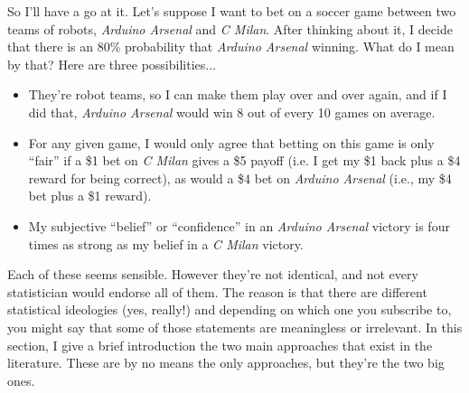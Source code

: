 So I'll have a go at it. Let's suppose I want to bet on a soccer game between two teams of robots, {\it Arduino Arsenal} and {\it C Milan}. After thinking about it, I decide that there is an 80\% probability that {\it Arduino Arsenal} winning. What do I mean by that? Here are three possibilities...
\begin{itemize}
\item They're robot teams, so I can make them play over and over again, and if I did that, {\it Arduino Arsenal} would win 8 out of every 10 games on average.
\item For any given game, I would only agree that betting on this game is only ``fair'' if a \$1 bet on {\it C Milan} gives a \$5 payoff (i.e. I get my \$1 back plus a \$4 reward for being correct), as would a \$4 bet on {\it Arduino Arsenal} (i.e., my \$4 bet plus a \$1 reward). 
\item My subjective ``belief'' or ``confidence'' in an {\it Arduino Arsenal} victory is four times as strong as my belief in a {\it C Milan} victory.
\end{itemize}
Each of these seems sensible. However they're not identical, and not every statistician would endorse all of them. The reason is that there are different statistical ideologies (yes, really!) and depending on which one you subscribe to, you might say that some of those statements are meaningless or irrelevant. In this section, I give a brief introduction the two main approaches that exist in the literature. These are by no means the only approaches, but they're the two big ones. 



